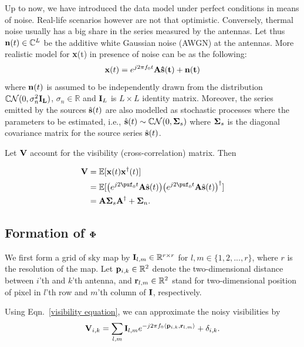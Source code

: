\documentclass{article}
\begin{document}
 Up to now, we have introduced the data model under perfect conditions in means of noise. Real-life scenarios however are not that optimistic. Conversely, thermal noise usually has a big share in the series measured by the antennas. Let thus ${\bf n}(t) \in \mathbb{C}^L$ be the additive white Gaussian noise (AWGN) at the antennas. More realistic model for {\bf x}(t) in presence of noise can be as the following:
 \begin{equation}
 {\bf x}(t) = e^{j2\pi f_0 t}\bf{A} \hat{\bf{s}}(t) + {\bf n}(t)\label{x_t}
 \end{equation}
where ${\bf n}(t)$ is assumed to be independently drawn from the distribution $\mathbb{C} \mathcal{N}(0,\sigma_n^2 \bf{I}_L)$, $\sigma_n \in \mathbb{R}$ and ${\bf I}_L$ is $L\times L$ identity matrix. Moreover, the series emitted by the sources $\hat{{\bf s}}(t)$ are also modelled as stochastic processes where the parameters to be estimated, i.e., $\hat{{\bf s}}(t) \sim \mathbb{C}\mathcal{N}(0, {\bf \Sigma}_s)$ where ${\bf \Sigma}_s$ is the diagonal covariance matrix for the source series $\hat{{\bf s}}(t)$. 

Let ${\bf V}$ account for the visibility (cross-correlation) matrix. Then

\begin{equation}
\begin{split}
{\bf V} & = \mathbb{E}[{\bf x}(t){\bf x}^{\dagger}(t)]\\
& = \mathbb{E}[\big(e^{j2\puf_0t}{\bf A}\hat{\bf s}(t)\big)\big(e^{j2\puf_0t}{\bf A}\hat{\bf s}(t)\big)^{\dagger}]\\
& ={\bf A}{\bf \Sigma}_s{\bf A}^{\dagger} + {\bf \Sigma}_n.
    \end{split}
\end{equation}

\subsection{Formation of ${\bf \Phi}$}
We first form a grid of sky map by ${\bf I}_{l, m} \in \mathbb{R}^{r\times r}$ for $l, m \in \{1, 2, ..., r \}$, where $r$ is the resolution of the map. Let ${\bf p}_{i, k} \in \mathbb{R}^2$ denote the two-dimensional distance between $i$'th and $k$'th antenna, and ${\bf r}_{l, m}\in \mathbb{R}^2$ stand for two-dimensional position of pixel in $l$'th row and $m$'th column of ${\bf I}$, respectively. 

Using Eqn.~\ref{visibility equation}, we can approximate the noisy visibilities by
\begin{equation}\label{measurement_equation}
    {\bf V}_{i, k} = \sum_{l, m} {\bf I}_{l, m} e^{-j2\pi f_0 \langle{\bf p}_{i, k}, {\bf r}_{l, m}\rangle} + \delta_{i, k}.
\end{equation}
\end{document}
